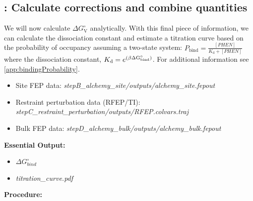 \documentclass[9pt,tutorial]{Styling/livecoms}
\newcommand{\filepath}[1]{\textit{#1}}
\begin{document}
\subsection{\hspace{-1em}: Calculate corrections and combine quantities}\label{step:combinequantities}
    \begin{tcolorbox}[colback=blue!5!white,colframe=blue!75!black]
    We will now calculate $\Delta G^\circ_\mathrm{V}$ analytically. With this final piece of information, we can calculate the dissociation constant and estimate a titration curve based on the probability of occupancy assuming a two-state system: $P_\mathrm{bind}=\frac{[PHEN]}{K_\mathrm{d}+[PHEN]}$ where the dissociation constant, ${K_\mathrm{d}}=e^{\left(\beta \Delta \rm{G^\circ_{bind}}\right)}$. For additional information see \ref{app:bindingProbability}.
    \end{tcolorbox}
    \begin{itemize}
        \item Site FEP data: \filepath{stepB\_alchemy\_site/outputs/alchemy\_site.fepout} 
        \item Restraint perturbation data (RFEP/TI): \filepath{stepC\_restraint\_perturbation/outputs/RFEP.colvars.traj}
        \item Bulk FEP data: \filepath{stepD\_alchemy\_bulk/outputs/alchemy\_bulk.fepout}
    \end{itemize}
    \textbf{Essential Output:}
    \begin{itemize}
        \item $\Delta G^\circ_{bind}$
        \item \filepath{titration\_curve.pdf}
    \end{itemize}
    \textbf{Procedure:}
\end{document}
